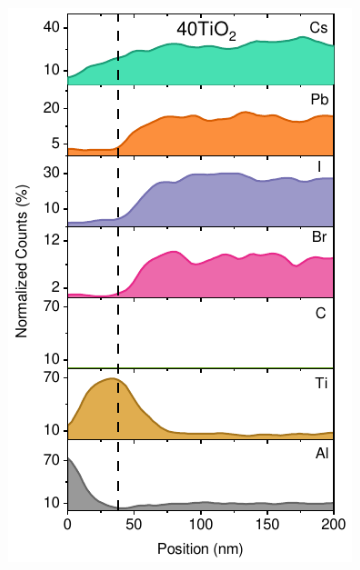 \begin{figure}[htbp]
\begin{subfigure}{0.32\textwidth}
        \includegraphics[width=\textwidth]{chapters/transport_layers/images/TEM_40TiO2.pdf}
        \caption{}
        \label{}
    \end{subfigure}
    \hfill
    \begin{subfigure}{0.32\textwidth}
        \centering

\end{subfigure}
\end{figure}
